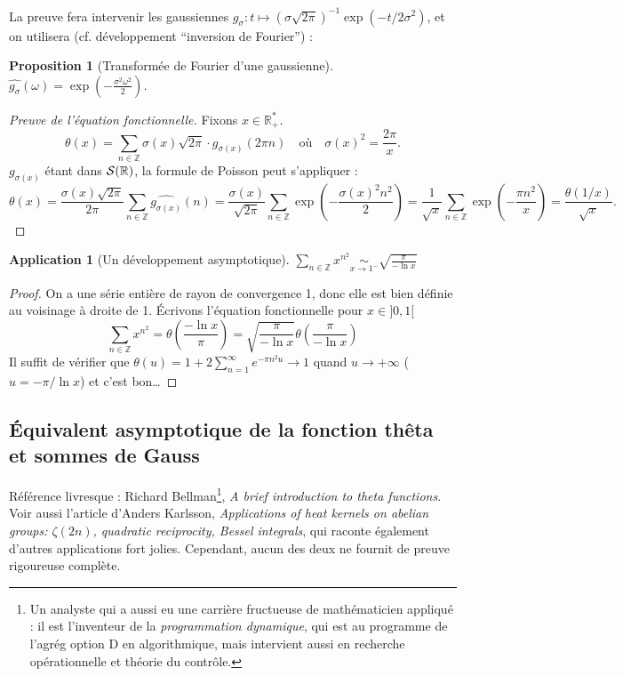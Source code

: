 \documentclass[a4paper, 11pt]{article}
\def\Z{\mathbb{Z}}
\def\R{\mathbb{R}}
\def\S{{\cal{S}}}
\newtheorem*{proposition}{Proposition}
\newtheorem*{application}{Application}
\begin{document}
La preuve fera intervenir les gaussiennes $g_\sigma : t \mapsto
(\sigma\sqrt{2\pi})^{-1} \exp(-t/2\sigma^2)$, et on utilisera (cf. développement
\enquote{inversion de Fourier}) :
\begin{proposition}[Transformée de Fourier d'une gaussienne]
  $\displaystyle \widehat{g_\sigma}(\omega) = \exp\left(- \frac{\sigma^2
      \omega^2}{2} \right)$. %
\end{proposition}

\begin{proof}[Preuve de l'équation fonctionnelle]
  Fixons $x \in \R_+^*$.
  \[ \theta(x) = \sum_{n \in \Z} \sigma(x)\sqrt{2\pi}
    \cdot g_{\sigma(x)}(2\pi n) \quad \text{où} \quad
    \sigma(x)^2 = \frac{2\pi}{x}.
  \]
  $g_{\sigma(x)}$ étant dans $\S(\R)$, la formule de Poisson peut s'appliquer :
  \[ \theta(x) =
    \frac{\sigma(x)\sqrt{2\pi}}{2\pi} \sum_{n \in \Z}
    \widehat{g_{\sigma(x)}}(n) =
    \frac{\sigma(x)}{\sqrt{2\pi}} \sum_{n \in \Z}
    \exp\left(-\frac{\sigma(x)^2 n^2}{2} \right) =
    \frac{1}{\sqrt{x}} \sum_{n \in \Z} \exp\left( -\frac{\pi n^2}{x} \right)
    = \frac{\theta(1/x)}{\sqrt{x}}.
  \]
\end{proof}

\begin{application}[Un développement asymptotique]
  $\displaystyle \sum_{n \in \Z} x^{n^2} \underset{x \to 1^-}{\sim}
  \sqrt{\frac{\pi}{- \ln x}}$
\end{application}
\begin{proof}
  On a une série entière de rayon de convergence 1, donc elle est bien définie
  au voisinage à droite de 1. Écrivons l'équation fonctionnelle pour $x \in
  ]0,1[$
  \[ \sum_{n \in \Z} x^{n^2} = \theta\left( \frac{- \ln x}{\pi} \right) =
      \sqrt{\frac{\pi}{- \ln x}} \theta\left( \frac{\pi}{- \ln x} \right)
  \]
  Il suffit de vérifier que $\displaystyle \theta(u) = 1 + 2 \sum_{n=1}^\infty
  e^{-\pi n^2 u}\to 1$ quand $u \to +\infty$ ($u = -\pi/\ln x$) et c'est bon…
\end{proof}

\newpage

\subsection{Équivalent asymptotique de la fonction thêta et sommes de Gauss}

Référence livresque : Richard Bellman\footnote{Un analyste qui a aussi eu une
  carrière fructueuse de mathématicien appliqué : il est l'inventeur de la
  \emph{programmation dynamique}, qui est au programme de l'agrég option D en
  algorithmique, mais intervient aussi en recherche opérationnelle et théorie du
  contrôle.}, \emph{A brief introduction to theta functions}. Voir aussi
l'article d'Anders Karlsson, \emph{Applications of heat kernels on abelian
  groups: $\zeta(2n)$, quadratic reciprocity, Bessel integrals}, qui raconte
également d'autres applications fort jolies. Cependant, aucun des deux ne
fournit de preuve rigoureuse complète.\\
\end{document}
